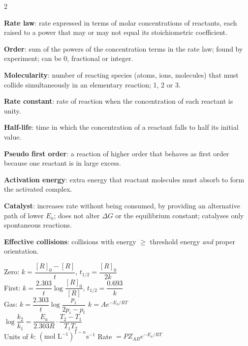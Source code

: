 \documentclass[10pt,a4paper]{extarticle}
\begin{document}
\begin{multicols}{2}
\begin{fl}
\item \textbf{Rate law}: rate expressed in terms of molar concentrations of reactants, each raised to a power that may or may not equal its stoichiometric coefficient.
\item \textbf{Order}: sum of the powers of the concentration terms in the rate law; found by experiment; can be 0, fractional or integer.
\item \textbf{Molecularity}: number of reacting species (atoms, ions, molecules) that must collide simultaneously in an elementary reaction; 1, 2 or 3.
\item \textbf{Rate constant}: rate of reaction when the concentration of each reactant is unity.
\item \textbf{Half-life}: time in which the concentration of a reactant falls to half its initial value.
\item \textbf{Pseudo first order}: a reaction of higher order that behaves as first order because one reactant is in large excess.
\item \textbf{Activation energy}: extra energy that reactant molecules must absorb to form the activated complex.
\item \textbf{Catalyst}: increases rate without being consumed, by providing an alternative path of lower $E_a$; does not alter $\Delta G$ or the equilibrium constant; catalyses only spontaneous reactions.
\item \textbf{Effective collisions}: collisions with energy $\ge$ threshold energy \emph{and} proper orientation.
\end{fl}

\begin{kbox}
Zero: $k=\dfrac{[R]_0-[R]}{t}$, \;$t_{1/2}=\dfrac{[R]_0}{2k}$\\[2pt]First: $k=\dfrac{2.303}{t}\log\dfrac{[R]_0}{[R]}$, \;$t_{1/2}=\dfrac{0.693}{k}$\\[2pt]
Gas: $k=\dfrac{2.303}{t}\log\dfrac{p_i}{2p_i-p_t}$ \qquad $k=Ae^{-E_a/RT}$\\[2pt]$\log\dfrac{k_2}{k_1}=\dfrac{E_a}{2.303R}\cdot\dfrac{T_2-T_1}{T_1T_2}$\\[2pt]
Units of $k$: $(\text{mol L}^{-1})^{1-n}\text{s}^{-1}$ \quad Rate $=PZ_{AB}e^{-E_a/RT}$
\end{kbox}


\end{multicols}
\end{document}

